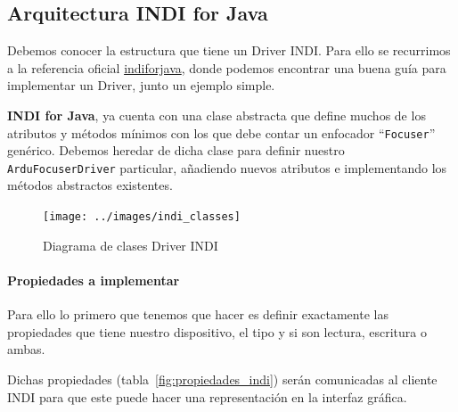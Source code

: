 \subsection{Arquitectura INDI for Java}

Debemos conocer la estructura que tiene un Driver INDI. Para ello se recurrimos a la referencia oficial   \href{http://www.indilib.org/develop/indiforjava/i4j-indi-driver.html}{indiforjava}, donde podemos encontrar una buena guía para implementar un Driver, junto un ejemplo simple. 

\textbf{INDI for Java}, ya cuenta con una clase abstracta que define muchos de los atributos y métodos mínimos con los que debe contar un enfocador ``\texttt{Focuser}'' genérico. Debemos heredar de dicha clase para definir nuestro \texttt{ArduFocuserDriver} particular, añadiendo nuevos atributos e implementando los métodos abstractos existentes. 


\begin{figure}
\centering
\texttt{[image: ../images/indi\_classes]}
\caption{Diagrama de clases Driver INDI}
\label{fig:indi_classes}
\end{figure}



\paragraph{Propiedades a implementar}

Para ello lo primero que tenemos que hacer es definir exactamente las propiedades que tiene nuestro dispositivo, el tipo y si son lectura, escritura o ambas. 

Dichas propiedades (tabla~\ref{fig:propiedades_indi}) serán comunicadas al cliente INDI para que este puede hacer una representación en la interfaz gráfica.

